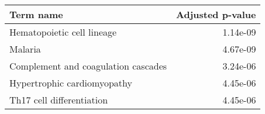 \begin{tabular}{lr}
\toprule
                          Term name &  Adjusted p-value \\
\midrule
         Hematopoietic cell lineage &          1.14e-09 \\
                            Malaria &          4.67e-09 \\
Complement and coagulation cascades &          3.24e-06 \\
        Hypertrophic cardiomyopathy &          4.45e-06 \\
          Th17 cell differentiation &          4.45e-06 \\
\bottomrule
\end{tabular}
